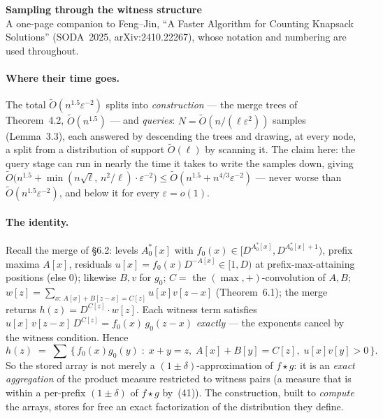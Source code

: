 \documentclass[10pt]{article}
\newcommand{\OO}{\widetilde{O}}
\begin{document}
\begin{center}
{\Large\bf Sampling through the witness structure}\\[2pt]
{\small A one-page companion to Feng--Jin, ``A Faster Algorithm for
Counting Knapsack Solutions'' (SODA~2025, arXiv:2410.22267), whose
notation and numbering are used throughout.}
\end{center}

\paragraph{Where their time goes.}
The total $\OO(n^{1.5}\varepsilon^{-2})$ splits into
\emph{construction} --- the merge trees of Theorem~4.2, $\OO(n^{1.5})$
--- and \emph{queries}: $N=\OO(n/(\ell\varepsilon^2))$ samples
(Lemma~3.3), each answered by descending the trees and drawing, at every
node, a split from a distribution of support $\OO(\ell)$ by scanning it.
The claim here: the query stage can run in nearly the time it takes to
write the samples down, giving
$\OO\!\bigl(n^{1.5}+\min(n\sqrt{\ell},\,n^2/\ell)\cdot\varepsilon^{-2}\bigr)
\le \OO(n^{1.5}+n^{4/3}\varepsilon^{-2})$ ---
never worse than $\OO(n^{1.5}\varepsilon^{-2})$, and below it for every
$\varepsilon=o(1)$.

\paragraph{The identity.}
Recall the merge of \S6.2: levels $A^*_0[x]$ with
$f_0(x)\in[D^{A^*_0[x]},D^{A^*_0[x]+1})$, prefix maxima $A[x]$, residuals
$u[x]=f_0(x)D^{-A[x]}\in[1,D)$ at prefix-max-attaining positions (else
$0$); likewise $B,v$ for $g_0$; $C=$ the $(\max,+)$-convolution of $A,B$;
$w[z]=\sum_{x:\,A[x]+B[z-x]=C[z]}u[x]v[z-x]$ (Theorem~6.1); the merge
returns $h(z)=D^{C[z]}\cdot w[z]$. Each witness term satisfies
$u[x]\,v[z-x]\,D^{C[z]}=f_0(x)\,g_0(z-x)$ \emph{exactly} --- the
exponents cancel by the witness condition. Hence
\[
h(z)\;=\;\textstyle\sum\,\bigl\{\,f_0(x)g_0(y)\;:\;x+y=z,\;
A[x]+B[y]=C[z],\;u[x]v[y]>0\,\bigr\}.
\]
So the stored array is not merely a $(1\pm\delta)$-approximation of
$f\star g$: it is an \emph{exact aggregation} of the product measure
restricted to witness pairs (a measure that is within a per-prefix
$(1\pm\delta)$ of $f\star g$ by~(41)). The construction, built to
\emph{compute} the arrays, stores for free an exact factorization of the
distribution they define.
\end{document}
